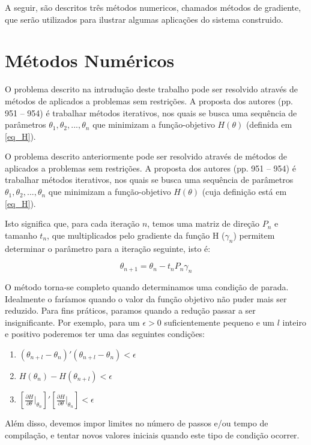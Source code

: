 \documentclass{abnt}
\begin{document}
A seguir, são descritos três métodos numericos, chamados métodos de gradiente, que serão utilizados para ilustrar algumas aplicações do sistema construido.

\section {Métodos Numéricos}

	O problema descrito na intrudução deste trabalho pode ser resolvido através de métodos de aplicados a problemas sem restrições. A proposta dos autores (pp. 951 -- 954) é trabalhar métodos iterativos, nos quais se busca uma sequência de parâmetros $\theta_{1}, \theta_{2}, ... , \theta_{n}$ que minimizam a função-objetivo  $H(\theta)$ (definida em \ref{eq_H}).

O problema descrito anteriormente pode ser resolvido através de métodos de aplicados a problemas sem restrições. A proposta dos autores (pp. 951 -- 954) é trabalhar métodos iterativos, nos quais se busca uma sequência de parâmetros $\theta_{1}, \theta_{2}, ... , \theta_{n}$ que minimizam a função-objetivo  $H(\theta)$ (cuja definição está em \ref{eq_H}).

Isto significa que, para cada iteração $n$, temos uma matriz de direção $P_{n}$ e tamanho $t_{n}$, que multiplicados pelo gradiente da função H ($\gamma_{n}$) permitem determinar o parâmetro para a iteração seguinte, isto é:

\[ \theta_{n+1} = \theta_{n} - t_{n}P_{n}\gamma_{n} \]

	O método torna-se completo quando determinamos uma condição de parada. Idealmente o faríamos quando o valor da função objetivo não puder mais ser reduzido. Para fins práticos, paramos quando a redução passar a ser insignificante. Por exemplo,  para um $\epsilon > 0$ suficientemente pequeno e um $l$ inteiro e positivo poderemos ter uma das seguintes condições:

\begin{enumerate}
\item $ ( \theta_{n+l} - \theta_n )'( \theta_{n+l} - \theta_n ) < \epsilon$
\item $ H(  \theta_n )- H (\theta_{n+l} ) < \epsilon$
\item $  [\frac{\partial H}{\partial \theta}\vert_{\theta_n}]'[\frac{\partial H}{\partial \theta}\vert_{\theta_n}] < \epsilon$
\end{enumerate}

Além disso, devemos impor limites no número de passos e/ou tempo de compilação, e tentar novos valores iniciais quando este tipo de condição ocorrer.
\end{document}
